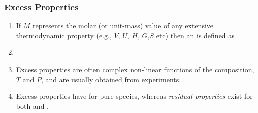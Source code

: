 \documentclass[10pt,compress,unknownkeysallowed]{beamer}
\begin{document}
\begin{frame}
  \frametitle{Excess Properties}
  \begin{enumerate}%
      \item<1-> If $M$ represents the molar (or unit-mass) value of any extensive thermodynamic property (e.g., $V$, $U$, $H$, $G$,$S$ etc) then an  is defined as
      \item<2-> 
      \item<3-> Excess properties are often complex non-linear functions of the composition, $T$ and $P$, and are usually obtained from experiments.
      \item<4-> Excess properties have  for pure species, whereas {\it residual properties} exist for both  and .
  \end{enumerate}
\end{frame}
\normalsize
\end{document}

